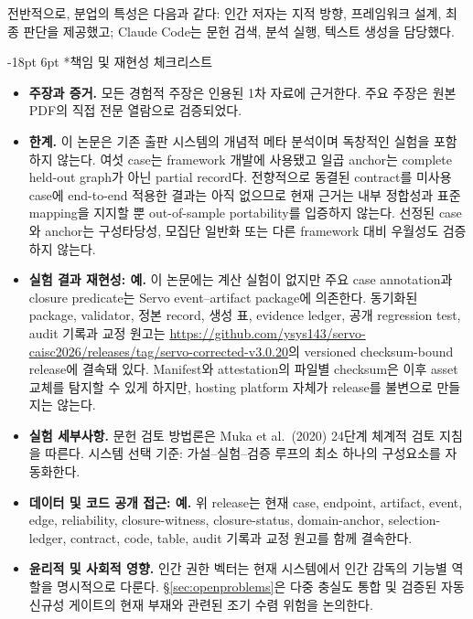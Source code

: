 \documentclass[11pt]{article}
\makeatletter
\renewcommand\section{\@startsection{section}{1}{\z@}%
  {-18pt \@plus -4pt \@minus -2pt}%
  {6pt \@plus 2pt}%
  {\normalfont\large\bfseries}}
\makeatother
\begin{document}
\noindent 전반적으로, 분업의 특성은 다음과 같다: 인간 저자는 지적 방향, 프레임워크 설계, 최종 판단을 제공했고; Claude Code는 문헌 검색, 분석 실행, 텍스트 생성을 담당했다.

\newpage
\section*{책임 및 재현성 체크리스트}
\label{sec:repro-checklist}

\begin{itemize}
  \item \textbf{주장과 증거.} 모든 경험적 주장은 인용된 1차 자료에 근거한다. 주요 주장은 원본 PDF의 직접 전문 열람으로 검증되었다.

  \item \textbf{한계.} 이 논문은 기존 출판 시스템의 개념적 메타 분석이며 독창적인 실험을 포함하지 않는다. 여섯 case는 framework 개발에 사용됐고 일곱 anchor는 complete held-out graph가 아닌 partial record다. 전향적으로 동결된 contract를 미사용 case에 end-to-end 적용한 결과는 아직 없으므로 현재 근거는 내부 정합성과 표준 mapping을 지지할 뿐 out-of-sample portability를 입증하지 않는다. 선정된 case와 anchor는 구성타당성, 모집단 일반화 또는 다른 framework 대비 우월성도 검증하지 않는다.

  \item \textbf{실험 결과 재현성: 예.} 이 논문에는 계산 실험이 없지만 주요 case annotation과 closure predicate는 Servo event--artifact package에 의존한다. 동기화된 package, validator, 정본 record, 생성 표, evidence ledger, 공개 regression test, audit 기록과 교정 원고는 \url{https://github.com/ysys143/servo-caisc2026/releases/tag/servo-corrected-v3.0.20}의 versioned checksum-bound release에 결속돼 있다. Manifest와 attestation의 파일별 checksum은 이후 asset 교체를 탐지할 수 있게 하지만, hosting platform 자체가 release를 불변으로 만들지는 않는다.

  \item \textbf{실험 세부사항.} 문헌 검토 방법론은 Muka et al.\ (2020) 24단계 체계적 검토 지침을 따른다. 시스템 선택 기준: 가설--실험--검증 루프의 최소 하나의 구성요소를 자동화한다.

  \item \textbf{데이터 및 코드 공개 접근: 예.} 위 release는 현재 case, endpoint, artifact, event, edge, reliability, closure-witness, closure-status, domain-anchor, selection-ledger, contract, code, table, audit 기록과 교정 원고를 함께 결속한다.

  \item \textbf{윤리적 및 사회적 영향.} 인간 권한 벡터는 현재 시스템에서 인간 감독의 기능별 역할을 명시적으로 다룬다. §\ref{sec:openproblems}은 다중 충실도 통합 및 검증된 자동 신규성 게이트의 현재 부재와 관련된 조기 수렴 위험을 논의한다.
\end{itemize}
\end{document}
